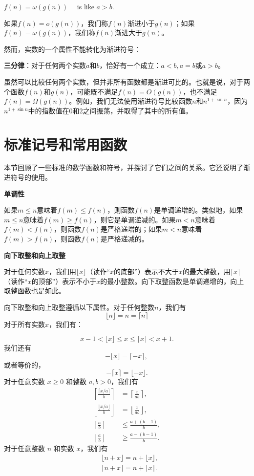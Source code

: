 \documentclass[lang=cn,newtx,10pt,scheme=chinese]{elegantbook}
\begin{document}
$f(n)=\omega(g(n)) \quad$ is like $a>b$.

如果$f(n)=o(g(n))$，我们称$f(n)$渐进小于$g(n)$；如果$f(n)=\omega(g(n))$，我们称$f(n)$渐进大于$g(n)$。

然而，实数的一个属性不能转化为渐进符号：

\textbf{三分律}：对于任何两个实数$a$和$b$，恰好有一个成立：$a<b, a=b$或$a>b$。

虽然可以比较任何两个实数，但并非所有函数都是渐进可比的。也就是说，对于两个函数$f(n)$和$g(n)$，可能既不满足$f(n)=O(g(n))$，也不满足$f(n)=\Omega(g(n))$。例如，我们无法使用渐进符号比较函数$n$和$n^{1+\sin n}$，因为$n^{1+\sin n}$中的指数值在0和2之间振荡，并取得了其中的所有值。

\section{标准记号和常用函数}

本节回顾了一些标准的数学函数和符号，并探讨了它们之间的关系。它还说明了渐进符号的使用。

\textbf{单调性}

如果$m\leq n$意味着$f(m)\leq f(n)$，则函数$f(n)$是单调递增的。类似地，如果$m\leq n$意味着$f(m)\geq f(n)$，则它是单调递减的。如果$m<n$意味着$f(m)<f(n)$，则函数$f(n)$是严格递增的；如果$m<n$意味着$f(m)>f(n)$，则函数$f(n)$是严格递减的。

\textbf{向下取整和向上取整}

对于任何实数$x$，我们用$\lfloor x\rfloor$（读作“$x$的底部”）表示不大于$x$的最大整数，用$\lceil x\rceil$（读作“$x$的顶部”）表示不小于$x$的最小整数。向下取整函数是单调递增的，向上取整函数也是如此。

向下取整和向上取整遵循以下属性。对于任何整数$n$，我们有
$$
\lfloor n\rfloor=n=\lceil n\rceil
$$
对于所有实数$x$，我们有：

$$
x-1<\lfloor x\rfloor \leq x \leq\lceil x\rceil<x+1 .
$$
我们还有
$$
-\lfloor x\rfloor=\lceil-x\rceil \text {, }
$$
或者等价的，
$$
-\lceil x\rceil=\lfloor-x\rfloor .
$$
对于任意实数 $x \geq 0$ 和整数 $a, b>0$，我们有
$$
\begin{aligned}
{\left[\frac{\lceil x / a\rceil}{b}\right\rceil } & =\left\lceil\frac{x}{a b}\right\rceil, \\
\left\lfloor\frac{\lfloor x / a\rfloor}{b}\right\rfloor & =\left\lfloor\frac{x}{a b}\right\rfloor, \\
\left\lceil\frac{a}{b}\right\rceil & \leq \frac{a+(b-1)}{b}, \\
\left\lfloor\frac{a}{b}\right\rfloor & \geq \frac{a-(b-1)}{b} .
\end{aligned}
$$
对于任意整数 $n$ 和实数 $x$，我们有
$$
\begin{aligned}
& \lfloor n+x\rfloor=n+\lfloor x\rfloor, \\
& \lceil n+x\rceil=n+\lceil x\rceil .
\end{aligned}
$$
\end{document}
